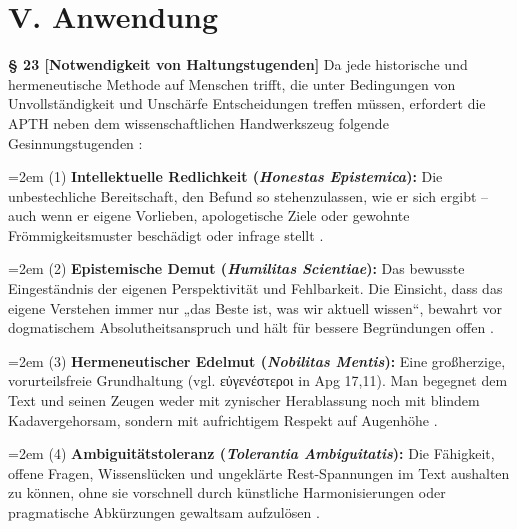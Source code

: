 \documentclass[11pt,a4paper]{article}
\makeatletter
\newcommand{\apth}{{\apthfont APTH}\hspace{0.15em}\xspace}
\newcommand{\subpar}[1]{%
  \begingroup
  \leftskip=2em %
  \noindent#1\par
  \endgroup
}
\newcommand{\apthsec}[3]{%
  \phantomsection%
  \def\@currentlabel{#1}%
  \label{sec:#3}%
  \textbf{§ #1 [#2]}%
}
\makeatother
\begin{document}
\section*{V. Anwendung}

\apthsec{23}{Notwendigkeit von Haltungstugenden}{tugenden} Da jede historische und hermeneutische Methode auf Menschen trifft, die unter Bedingungen von Unvollständigkeit und Unschärfe Entscheidungen treffen müssen, erfordert die \apth neben dem wissenschaftlichen Handwerkszeug folgende Gesinnungstugenden \citep{zagzebski1996}:

\subpar{(1) \textbf{Intellektuelle Redlichkeit (\textit{Honestas Epistemica}):} Die unbestechliche Bereitschaft, den Befund so stehenzulassen, wie er sich ergibt – auch wenn er eigene Vorlieben, apologetische Ziele oder gewohnte Frömmigkeitsmuster beschädigt oder infrage stellt \citep{williams2002}.}

\subpar{(2) \textbf{Epistemische Demut (\textit{Humilitas Scientiae}):} Das bewusste Eingeständnis der eigenen Perspektivität und Fehlbarkeit. Die Einsicht, dass das eigene Verstehen immer nur „das Beste ist, was wir aktuell wissen“, bewahrt vor dogmatischem Absolutheitsanspruch und hält für bessere Begründungen offen \citep{popper1963}.}

\subpar{(3) \textbf{Hermeneutischer Edelmut (\textit{Nobilitas Mentis}):} Eine großherzige, vorurteilsfreie Grundhaltung (vgl. εὐγενέστεροι in Apg 17,11). Man begegnet dem Text und seinen Zeugen weder mit zynischer Herablassung noch mit blindem Kadavergehorsam, sondern mit aufrichtigem Respekt auf Augenhöhe \citep{davidson1974,jacobs2001}.}

\subpar{(4) \textbf{Ambiguitätstoleranz (\textit{Tolerantia Ambiguitatis}):} Die Fähigkeit, offene Fragen, Wissenslücken und ungeklärte Rest-Spannungen im Text aushalten zu können, ohne sie vorschnell durch künstliche Harmonisierungen oder pragmatische Abkürzungen gewaltsam aufzulösen \citep{frenkelbrunswik1949}.} 
\end{document}
